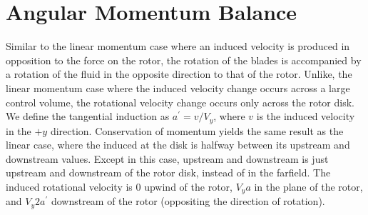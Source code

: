 \documentclass{article}
\begin{document}
%
%




\section{Angular Momentum Balance}

Similar to the linear momentum case where an induced velocity is produced in opposition to the force on the rotor, the rotation of the blades is accompanied by a rotation of the fluid in the opposite direction to that of the rotor.  Unlike, the linear momentum case where the induced velocity change occurs across a large control volume, the rotational velocity change occurs only across the rotor disk. We define the tangential induction as $a^\prime = v/V_y$, where $v$ is the induced velocity in the $+y$ direction.  Conservation of momentum yields the same result as the linear case, where the induced at the disk is halfway between its upstream and downstream values.  Except in this case, upstream and downstream is just upstream and downstream of the rotor disk, instead of in the farfield.  The induced rotational velocity is 0 upwind of the rotor, $V_y a$ in the plane of the rotor, and $V_y 2 a^\prime$ downstream of the rotor (oppositing the direction of rotation).
\end{document}
